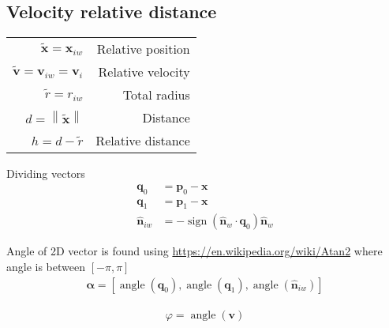 \subsection{Velocity relative distance}

\begin{table}[H]
\centering
\begin{tabularx}{1.0\linewidth}{ R R }
\hline
\hline
$ \tilde{\mathbf{x}} = \mathbf{x}_{iw} $ & Relative position \\
$ \tilde{\mathbf{v}} = \mathbf{v}_{iw} = \mathbf{v}_{i} $ & Relative velocity \\
$ \tilde{r} = r_{iw} $ & Total radius \\
$ d = \left\|\tilde{\mathbf{x}}\right\| $ & Distance\\
$ h = d - \tilde{r} $ & Relative distance \\
\hline
\hline
\end{tabularx}
\end{table}

Dividing vectors
\begin{align}
\mathbf{q}_{0} &= \mathbf{p}_{0} - \mathbf{x} \\
\mathbf{q}_{1} &= \mathbf{p}_{1} - \mathbf{x} \\
\hat{\mathbf{n}}_{iw} &= - \operatorname{sign}(\hat{\mathbf{n}}_{w} \cdot \mathbf{q}_{0}) \hat{\mathbf{n}}_{w}
\end{align}

Angle of 2D vector is found using \url{https://en.wikipedia.org/wiki/Atan2} where angle is between $ [-\pi, \pi] $
\newcommand{\atan}{\ensuremath{\operatorname{angle}}}
\begin{align}
\boldsymbol{\alpha} = [\atan(\mathbf{q}_{0}), \atan(\mathbf{q}_{1}), \atan(\hat{\mathbf{n}}_{iw})]
\end{align}

\begin{align}
\varphi = \atan(\mathbf{v})
\end{align}

